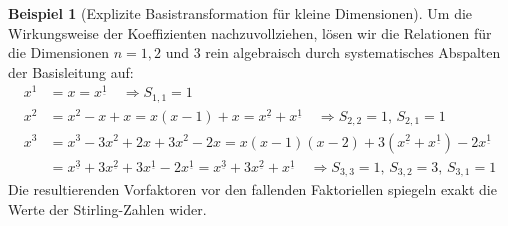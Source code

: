\documentclass{article}
\theoremstyle{definition}
\newtheorem{bsp}[thm]{Beispiel}
\begin{document}
\begin{bsp}[Explizite Basistransformation für kleine Dimensionen]
Um die Wirkungsweise der Koeffizienten nachzuvollziehen, lösen wir die Relationen für die Dimensionen $n=1, 2$ und $3$ rein algebraisch durch systematisches Abspalten der Basisleitung auf:
\begin{align*}
    x^1 &= x = x^{\underline{1}} \quad \Longrightarrow S_{1,1}=1 \\
    x^2 &= x^2 - x + x = x(x-1) + x = x^{\underline{2}} + x^{\underline{1}} \quad \Longrightarrow S_{2,2}=1,\, S_{2,1}=1 \\
    x^3 &= x^3 - 3x^2 + 2x + 3x^2 - 2x = x(x-1)(x-2) + 3(x^{\underline{2}} + x^{\underline{1}}) - 2x^{\underline{1}} \\
        &= x^{\underline{3}} + 3x^{\underline{2}} + 3x^{\underline{1}} - 2x^{\underline{1}} = x^{\underline{3}} + 3x^{\underline{2}} + x^{\underline{1}} \quad \Longrightarrow S_{3,3}=1,\, S_{3,2}=3,\, S_{3,1}=1
\end{align*}
Die resultierenden Vorfaktoren vor den fallenden Faktoriellen spiegeln exakt die Werte der Stirling-Zahlen wider.
\end{bsp}
\end{document}
